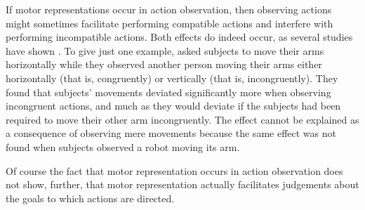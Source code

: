 \documentclass[12pt,\papersize]{extarticle}
\begin{document}
If motor representations occur in action observation, then observing actions might sometimes facilitate performing compatible actions and interfere with performing incompatible actions.  Both effects do indeed occur, as several studies have shown \citep{brass:2000_compatibility, craighero:2002_hand, kilner:2003_interference, costantini:2012_does}. To give just one example, \citet{kilner:2003_interference} asked subjects to move their arms horizontally while they observed another person moving their arms either horizontally (that is, congruently) or vertically (that is, incongruently). They found that subjects' movements deviated significantly more when observing incongruent actions, and much as they would deviate if the subjects had been required to move their other arm incongruently. The effect cannot be explained as a consequence of observing mere movements because the same effect was not found when subjects observed a robot moving its arm.

Of course the fact that motor representation occurs in action observation does not show, further, that motor representation actually facilitates judgements about the goals to which actions are directed.  
\end{document}
